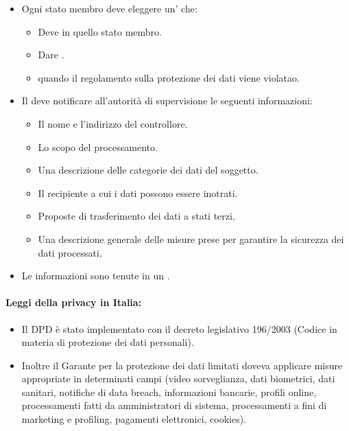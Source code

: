 \begin{itemize}
  \item Ogni stato membro deve eleggere un' che: 
    \begin{itemize}
      \item Deve  in quello stato membro. 
      \item Dare . 
      \item {} quando il regolamento sulla protezione dei dati viene violatao.
    \end{itemize}
  \item Il  deve notificare all'autorità di supervisione le seguenti informazioni:
    \begin{itemize}
      \item Il nome e l'indirizzo del controllore. 
      \item Lo scopo del processamento. 
      \item Una descrizione delle categorie dei dati del soggetto. 
      \item Il recipiente a cui i dati possono essere inotrati. 
      \item Proposte di trasferimento dei dati a stati terzi. 
      \item Una descrizione generale delle misure prese per garantire la sicurezza dei dati processati.
    \end{itemize}
  \item Le informazioni sono tenute in un .
\end{itemize}

\paragraph{Leggi della privacy in Italia:}

\begin{itemize}
  \item Il DPD è stato implementato con il decreto legislativo 196/2003 (Codice in materia di protezione dei dati personali). 
  \item Inoltre il Garante per la protezione dei dati limitati doveva applicare misure appropriate in determinati campi (video sorveglianza, dati biometrici, dati sanitari, notifiche di data breach, informazioni bancarie, profili online, processamenti fatti da amministratori di sistema, processamenti a fini di marketing e profiling, pagamenti elettronici, cookies).
\end{itemize}

